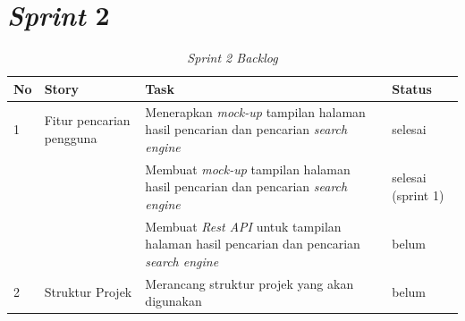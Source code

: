 \section{\textit{Sprint} 2}

\begin{longtable}{@{}|p{0.5cm}|p{4cm}|p{6cm}|p{2cm}|@{}}
	\caption{\textit{Sprint 2 Backlog}}\\	
	\hline
	\textbf{No} & \textbf{Story} & \textbf{Task} & \textbf{Status} \\
	\hline
	1 & Fitur pencarian pengguna & Menerapkan \textit{mock-up} tampilan halaman hasil pencarian dan pencarian \textit{search engine} & selesai \\
	\cline{3-4}
	& & Membuat \textit{mock-up} tampilan halaman hasil pencarian dan pencarian \textit{search engine} & selesai (sprint 1) \\
	\cline{3-4}
	& & Membuat \textit{Rest API} untuk tampilan halaman hasil pencarian dan pencarian \textit{search engine} & belum \\
	\cline{1-4}
	2 & Struktur Projek & Merancang struktur projek yang akan digunakan & belum \\
	\cline{1-4}
	
\end{longtable}


